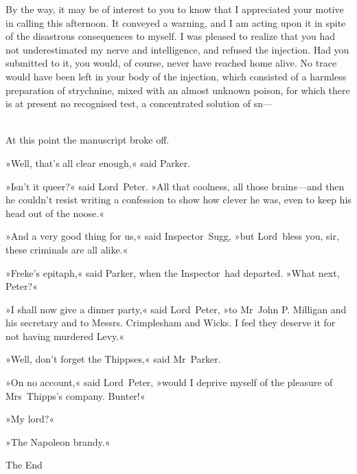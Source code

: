 By the way, it may be of interest to you to know that I appreciated your motive in calling this afternoon. It conveyed a warning, and I am acting upon it in spite of the disastrous consequences to myself. I was pleased to realize that you had not underestimated my nerve and intelligence, and refused the injection. Had you submitted to it, you would, of course, never have reached home alive. No trace would have been left in your body of the injection, which consisted of a harmless preparation of strychnine, mixed with an almost unknown poison, for which there is at present no recognised test, a concentrated solution of sn—

~\\

At this point the manuscript broke off.

»Well, that's all clear enough,« said Parker.

»Isn't it queer?« said Lord~Peter. »All that coolness, all those brains—and then he couldn't resist writing a confession to show how clever he was, even to keep his head out of the noose.«

»And a very good thing for us,« said Inspector~Sugg, »but Lord~bless you, sir, these criminals are all alike.«

»Freke's epitaph,« said Parker, when the Inspector~had departed. »What next, Peter?«

»I shall now give a dinner party,« said Lord~Peter, »to Mr~John P\@. Milligan and his secretary and to Messrs. Crimplesham and Wicks. I feel they deserve it for not having murdered Levy.«

»Well, don't forget the Thippses,« said Mr~Parker.

»On no account,« said Lord~Peter, »would I deprive myself of the pleasure of Mrs~Thipps's company. Bunter!«

»My lord?«

»The Napoleon brandy.«

\begin{center}\mytitlefont\HUGE
	The End
\end{center}